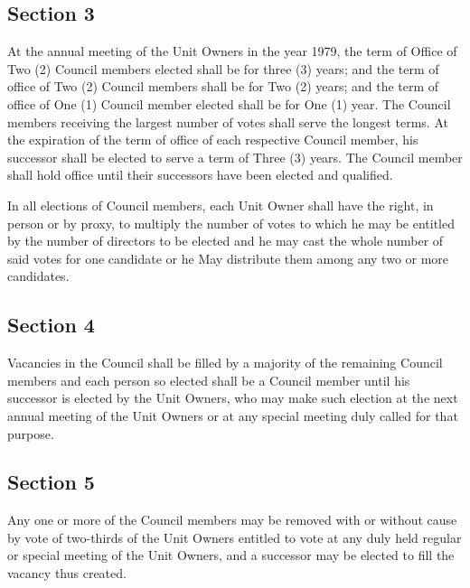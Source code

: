 \documentclass[
  14pt,
]{book}
\begin{document}
\hypertarget{section-3-1}{%
\subsection*{Section 3}\label{section-3-1}}

At the annual meeting of the Unit Owners in the year 1979, the term of Office of Two (2) Council members elected shall be for three (3) years; and the term of office of Two (2) Council members shall be for Two (2) years; and the term of office of One (1) Council member elected shall be for One (1) year. The Council members receiving the largest number of votes shall serve the longest terms. At the expiration of the term of office of each respective Council member, his successor shall be elected to serve a term of Three (3) years. The Council member shall hold office until their successors have been elected and qualified.

In all elections of Council members, each Unit Owner shall have the right, in person or by proxy, to multiply the number of votes to which he may be entitled by the number of directors to be elected and he may cast the whole number of said votes for one candidate or he May distribute them among any two or more candidates.

\hypertarget{section-4-1}{%
\subsection*{Section 4}\label{section-4-1}}

Vacancies in the Council shall be filled by a majority of the remaining Council members and each person so elected shall be a Council member until his successor is elected by the Unit Owners, who may make such election at the next annual meeting of the Unit Owners or at any special meeting duly called for that purpose.

\hypertarget{section-5-1}{%
\subsection*{Section 5}\label{section-5-1}}

Any one or more of the Council members may be removed with or without cause by vote of two-thirds of the Unit Owners entitled to vote at any duly held regular or special meeting of the Unit Owners, and a successor may be elected to fill the vacancy thus created.
\end{document}
